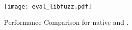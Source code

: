 \begin{figure}
\centering
\texttt{[image: eval\_libfuzz.pdf]}
\caption{Performance Comparison for native \libfuzzer and \sys.}
\label{fig:libfuzz}
\end{figure}

%
%
%
%
%
%
%
%
%
%
%
%
%
%
%

